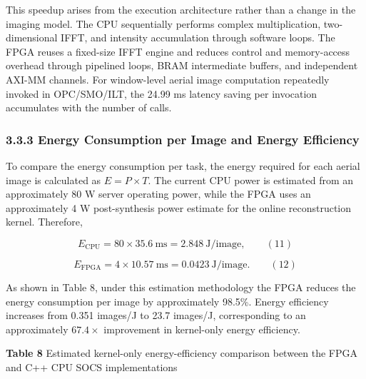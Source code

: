 \documentclass[
  preprint]{elsarticle}
\begin{document}
This speedup arises from the execution architecture rather than a change
in the imaging model. The CPU sequentially performs complex
multiplication, two-dimensional IFFT, and intensity accumulation through
software loops. The FPGA reuses a fixed-size IFFT engine and reduces
control and memory-access overhead through pipelined loops, BRAM
intermediate buffers, and independent AXI-MM channels. For window-level
aerial image computation repeatedly invoked in OPC/SMO/ILT, the 24.99 ms
latency saving per invocation accumulates with the number of calls.

\subsubsection{3.3.3 Energy Consumption per Image and Energy
Efficiency}\label{energy-consumption-per-image-and-energy-efficiency}

To compare the energy consumption per task, the energy required for each
aerial image is calculated as \(E=P\times T\). The current CPU power is
estimated from an approximately 80 W server operating power, while the
FPGA uses an approximately 4 W post-synthesis power estimate for the
online reconstruction kernel. Therefore,

\[
E_{\mathrm{CPU}}=80\times35.6\ \mathrm{ms}=2.848\ \mathrm{J/image},
\qquad\mathrm{(11)}
\]

\[
E_{\mathrm{FPGA}}=4\times10.57\ \mathrm{ms}=0.0423\ \mathrm{J/image}.
\qquad\mathrm{(12)}
\]

As shown in Table 8, under this estimation methodology the FPGA reduces
the energy consumption per image by approximately 98.5\%. Energy
efficiency increases from 0.351 images/J to 23.7 images/J, corresponding
to an approximately \(67.4\times\) improvement in kernel-only energy
efficiency.

\textbf{Table 8} Estimated kernel-only energy-efficiency comparison
between the FPGA and C++ CPU SOCS implementations
\end{document}
